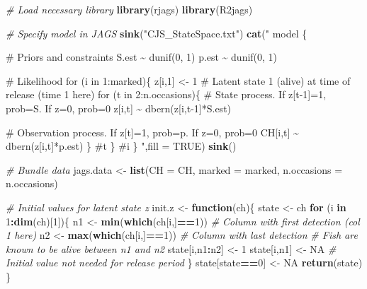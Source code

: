 \documentclass[
]{krantz}
\makeatletter
\newenvironment{Shaded}{\begin{snugshade}}{\end{snugshade}}
\newcommand{\AttributeTok}[1]{\textcolor[rgb]{0.27,0.27,0.27}{#1}}
\newcommand{\CommentTok}[1]{\textcolor[rgb]{0.37,0.37,0.37}{\textit{#1}}}
\newcommand{\ConstantTok}[1]{\textcolor[rgb]{0.37,0.37,0.37}{#1}}
\newcommand{\ControlFlowTok}[1]{\textcolor[rgb]{0.27,0.27,0.27}{\textbf{#1}}}
\newcommand{\DecValTok}[1]{\textcolor[rgb]{0.06,0.06,0.06}{#1}}
\newcommand{\FunctionTok}[1]{\textcolor[rgb]{0.27,0.27,0.27}{\textbf{#1}}}
\newcommand{\NormalTok}[1]{#1}
\newcommand{\OtherTok}[1]{\textcolor[rgb]{0.37,0.37,0.37}{#1}}
\newcommand{\SpecialCharTok}[1]{\textcolor[rgb]{0.43,0.43,0.43}{\textbf{#1}}}
\newcommand{\StringTok}[1]{\textcolor[rgb]{0.5,0.5,0.5}{#1}}
\newenvironment{kframe}{%
\medskip{}
\setlength{\fboxsep}{.8em}
 \def\at@end@of@kframe{}%
 \ifinner\ifhmode%
  \def\at@end@of@kframe{\end{minipage}}%
  \begin{minipage}{\columnwidth}%
 \fi\fi%
 \def\FrameCommand##1{\hskip\@totalleftmargin \hskip-\fboxsep
 \colorbox{shadecolor}{##1}\hskip-\fboxsep
     \hskip-\linewidth \hskip-\@totalleftmargin \hskip\columnwidth}%
 \MakeFramed {\advance\hsize-\width
   \@totalleftmargin\z@ \linewidth\hsize
   \@setminipage}}%
 {\par\unskip\endMakeFramed%
 \at@end@of@kframe}
\renewenvironment{Shaded}{\begin{kframe}}{\end{kframe}}
\makeatother
\begin{document}
\begin{Shaded}
\begin{Highlighting}[]
\CommentTok{\# Load necessary library}
\FunctionTok{library}\NormalTok{(rjags)}
\FunctionTok{library}\NormalTok{(R2jags)}

\CommentTok{\# Specify model in JAGS}
\FunctionTok{sink}\NormalTok{(}\StringTok{"CJS\_StateSpace.txt"}\NormalTok{)}
\FunctionTok{cat}\NormalTok{(}\StringTok{"}
\StringTok{model \{}

\StringTok{\# Priors and constraints}
\StringTok{S.est \textasciitilde{} dunif(0, 1)}
\StringTok{p.est \textasciitilde{} dunif(0, 1)}

\StringTok{\# Likelihood}
\StringTok{for (i in 1:marked)\{}
\StringTok{   z[i,1] \textless{}{-} 1 \# Latent state 1 (alive) at time of release (time 1 here)}
\StringTok{   for (t in 2:n.occasions)\{}
\StringTok{      \# State process. If z[t{-}1]=1, prob=S. If z=0, prob=0}
\StringTok{      z[i,t] \textasciitilde{} dbern(z[i,t{-}1]*S.est)}

\StringTok{      \# Observation process. If z[t]=1, prob=p. If z=0, prob=0}
\StringTok{      CH[i,t] \textasciitilde{} dbern(z[i,t]*p.est)}
\StringTok{      \} \#t}
\StringTok{   \} \#i}
\StringTok{\}}
\StringTok{"}\NormalTok{,}\AttributeTok{fill =} \ConstantTok{TRUE}\NormalTok{)}
\FunctionTok{sink}\NormalTok{()}

\CommentTok{\# Bundle data}
\NormalTok{jags.data }\OtherTok{\textless{}{-}} \FunctionTok{list}\NormalTok{(}\AttributeTok{CH =}\NormalTok{ CH, }\AttributeTok{marked =}\NormalTok{ marked, }\AttributeTok{n.occasions =}\NormalTok{ n.occasions)}

\CommentTok{\# Initial values for latent state z}
\NormalTok{init.z }\OtherTok{\textless{}{-}} \ControlFlowTok{function}\NormalTok{(ch)\{}
\NormalTok{  state }\OtherTok{\textless{}{-}}\NormalTok{ ch}
  \ControlFlowTok{for}\NormalTok{ (i }\ControlFlowTok{in} \DecValTok{1}\SpecialCharTok{:}\FunctionTok{dim}\NormalTok{(ch)[}\DecValTok{1}\NormalTok{])\{}
\NormalTok{    n1 }\OtherTok{\textless{}{-}} \FunctionTok{min}\NormalTok{(}\FunctionTok{which}\NormalTok{(ch[i,]}\SpecialCharTok{==}\DecValTok{1}\NormalTok{)) }\CommentTok{\# Column with first detection (col 1 here)}
\NormalTok{    n2 }\OtherTok{\textless{}{-}} \FunctionTok{max}\NormalTok{(}\FunctionTok{which}\NormalTok{(ch[i,]}\SpecialCharTok{==}\DecValTok{1}\NormalTok{)) }\CommentTok{\# Column with last detection}
    \CommentTok{\# Fish are known to be alive between n1 and n2}
\NormalTok{    state[i,n1}\SpecialCharTok{:}\NormalTok{n2] }\OtherTok{\textless{}{-}} \DecValTok{1}
\NormalTok{    state[i,n1] }\OtherTok{\textless{}{-}} \ConstantTok{NA} \CommentTok{\# Initial value not needed for release period}
\NormalTok{  \}}
\NormalTok{  state[state}\SpecialCharTok{==}\DecValTok{0}\NormalTok{] }\OtherTok{\textless{}{-}} \ConstantTok{NA}
  \FunctionTok{return}\NormalTok{(state)}
\NormalTok{\}}


\end{Highlighting}
\end{Shaded}
\end{document}
